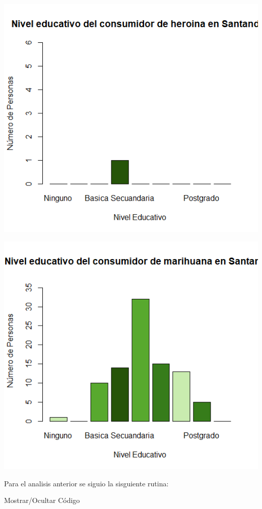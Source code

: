 \documentclass[
]{article}
\begin{document}
\includegraphics{images/heroina educacion santander.png}

\includegraphics{images/marihuana eduacion santander.png}

Para el analisis anterior se siguio la sisguiente rutina:

Mostrar/Ocultar Código
\end{document}
